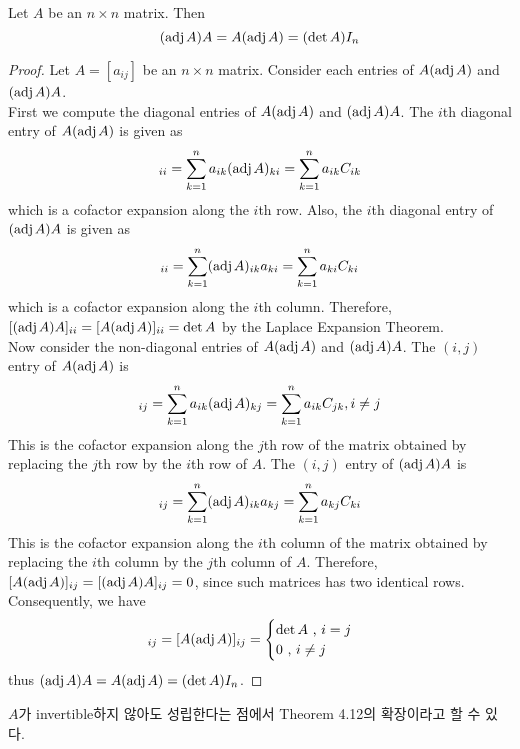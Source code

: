 \begin{plaintheorem}
	Let $A$ be an $n \times n$ matrix. Then \begin{equation*}
		(\text{adj}\hspace{.3ex}{A})A = A(\text{adj}\hspace{.3ex}{A})=(\det{A})I_n
	\end{equation*}
\end{plaintheorem}
\begin{proof}
	Let $A = [a_{ij}]$ be an $n \times n$ matrix. Consider each entries of $A(\text{adj}\hspace{.3ex}{A})$ and $(\text{adj}\hspace{.3ex}{A})A$. \\
	
	First we compute the diagonal entries of $A(\text{adj}\hspace{.3ex}{A})$ and $(\text{adj}\hspace{.3ex}{A})A$. The $i$th diagonal entry of $A(\text{adj}\hspace{.3ex}{A})$ is given as \begin{align*}
		[A(\adj{A})]_{ii} = \sum_{k=1}^{n}a_{ik}(\adj{A})_{ki} = \sum_{k=1}^{n}a_{ik}C_{ik}
	\end{align*}
	which is a cofactor expansion along the $i$th row. Also, the $i$th diagonal entry of $(\text{adj}\hspace{.3ex}{A})A$ is given as \begin{equation*}
		[(\adj{A})A]_{ii} = \sum_{k=1}^{n}(\adj{A})_{ik}a_{ki} = \sum_{k=1}^{n}a_{ki}C_{ki}
	\end{equation*} which is a cofactor expansion along the $i$th column. Therefore, $[(\text{adj}\hspace{.3ex}{A})A]_{ii} = [A(\text{adj}\hspace{.3ex}{A})]_{ii} = \det{A}$ by the Laplace Expansion Theorem. \\
	
	Now consider the non-diagonal entries of $A(\text{adj}\hspace{.3ex}{A})$ and $(\text{adj}\hspace{.3ex}{A})A$. The $(i,j)$ entry of $A(\text{adj}\hspace{.3ex}{A})$ is \begin{align*}
		[A(\adj{A})]_{ij} = \sum_{k=1}^{n}a_{ik}(\adj{A})_{kj} = \sum_{k=1}^{n}a_{ik}C_{jk}, i \neq j
	\end{align*}
	This is the cofactor expansion along the $j$th row of the matrix obtained by replacing the $j$th row by the $i$th row of $A$. The $(i, j)$ entry of $(\text{adj}\hspace{.3ex}{A})A$ is \begin{equation*}
		[(\adj{A})A]_{ij} = \sum_{k=1}^{n}(\adj{A})_{ik}a_{kj} = \sum_{k=1}^{n}a_{kj}C_{ki}
	\end{equation*} This is the cofactor expansion along the $i$th column of the matrix obtained by replacing the $i$th column by the $j$th column of $A$. Therefore, $[A(\text{adj}\hspace{.3ex}{A})]_{ij} = [(\text{adj}\hspace{.3ex}{A})A]_{ij} = 0$, since such matrices has two identical rows. \\
	
	Consequently, we have \begin{equation*}
		[(\adj{A})A]_{ij} = [A(\adj{A})]_{ij} = \begin{cases}
			\det{A} \mbox{ , $i = j$ } \\
			0 \mbox{ , $i \neq j$ }
		\end{cases}
	\end{equation*} thus $(\text{adj}\hspace{.3ex}{A})A = A(\text{adj}\hspace{.3ex}{A}) = (\det{A})I_n$.
\end{proof}
{\color{blue}$A$가 invertible하지 않아도 성립한다는 점에서 Theorem 4.12의 확장이라고 할 수 있다.}

